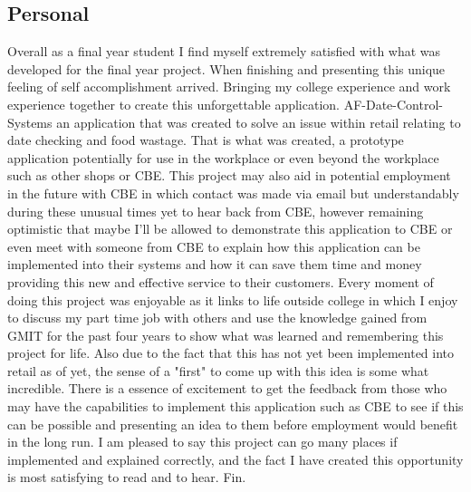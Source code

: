 \subsection{Personal}
Overall as a final year student I find myself extremely satisfied with what was developed for the final year project. When finishing and presenting this unique feeling of self accomplishment arrived. Bringing my college experience and work experience together to create this unforgettable application. AF-Date-Control-Systems an application that was created to solve an issue within retail relating to date checking and food wastage. That is what was created, a prototype application potentially for use in the workplace or even beyond the workplace such as other shops or CBE.
\newpage
This project may also aid in potential employment in the future with CBE in which contact was made via email but understandably during these unusual times yet to hear back from CBE, however remaining optimistic that maybe I'll be allowed to demonstrate this application to CBE or even meet with someone from CBE to explain how this application can be implemented into their systems and how it can save them time and money providing this new and effective service to their customers. Every moment of doing this project was enjoyable as it links to life outside college in which I enjoy to discuss my part time job with others and use the knowledge gained from GMIT for the past four years to show what was learned and remembering this project for life. Also due to the fact that this has not yet been implemented into retail as of yet, the sense of a "first" to come up with this idea is some what incredible. There is a essence of excitement to get the feedback from those who may have the capabilities to implement this application such as CBE to see if this can be possible and presenting an idea to them before employment would benefit in the long run. I am pleased to say this project can go many places if implemented and explained correctly, and the fact I have created this opportunity is most satisfying to read and to hear. Fin.

